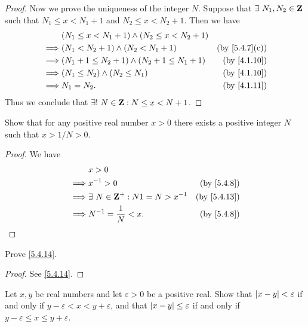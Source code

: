 \begin{proof}
  Now we prove the uniqueness of the integer \(N\).
  Suppose that \(\exists\ N_1, N_2 \in \mathbf{Z}\) such that \(N_1 \leq x < N_1 + 1\) and \(N_2 \leq x < N_2 + 1\).
  Then we have
  \begin{align*}
             & (N_1 \leq x < N_1 + 1) \land (N_2 \leq x < N_2 + 1)                               \\
    \implies & (N_1 < N_2 + 1) \land (N_2 < N_1 + 1)               & \text{(by \cref{5.4.7}(c))} \\
    \implies & (N_1 + 1 \leq N_2 + 1) \land (N_2 + 1 \leq N_1 + 1) & \text{(by \cref{4.1.10})}   \\
    \implies & (N_1 \leq N_2) \land (N_2 \leq N_1)                 & \text{(by \cref{4.1.10})}   \\
    \implies & N_1 = N_2.                                          & \text{(by \cref{4.1.11})}
  \end{align*}
  Thus we conclude that \(\exists!\ N \in \mathbf{Z} : N \leq x < N + 1\).
\end{proof}

\begin{exercise}\label{ex 5.4.4}
  Show that for any positive real number \(x > 0\) there exists a positive integer \(N\) such that \(x > 1 / N > 0\).
\end{exercise}

\begin{proof}
  We have
  \begin{align*}
             & x > 0                                                             \\
    \implies & x^{-1} > 0                            & \text{(by \cref{5.4.8})}  \\
    \implies & \exists\ N \in \Z^+ : N1 = N > x^{-1} & \text{(by \cref{5.4.13})} \\
    \implies & N^{-1} = \frac{1}{N} < x.             & \text{(by \cref{5.4.8})}
  \end{align*}
\end{proof}

\begin{exercise}\label{ex 5.4.5}
  Prove \cref{5.4.14}.
\end{exercise}

\begin{proof}
  See \cref{5.4.14}.
\end{proof}

\begin{exercise}\label{ex 5.4.6}
  Let \(x, y\) be real numbers and let \(\varepsilon > 0\) be a positive real.
  Show that \(\left\lvert x - y\right\rvert < \varepsilon\) if and only if \(y - \varepsilon < x < y + \varepsilon\), and that \(\left\lvert x - y\right\rvert \leq \varepsilon\) if and only if \(y - \varepsilon \leq x \leq y + \varepsilon\).
\end{exercise}

